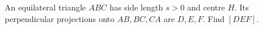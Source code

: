 An equilateral triangle $ ABC $ has side length $ s>0 $ and centre $ H $. Its perpendicular projections onto $ AB,BC,CA $ are $ D,E,F $. Find $[DEF]$.
